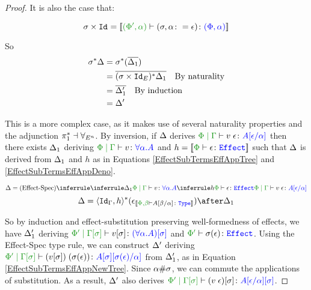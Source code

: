 \documentclass{Report}
\begin{document}
\begin{framed}
\begin{proof}
    It is also the case that:
    
    \begin{equation}
        \si\times\Id{} = \deno{\typerelation{(\P',\a)}{(\si, \a\setto\e)}{(\P,\a)}}
    \end{equation}
    
    So
    \begin{align*}
        \sigma^*\Delta &= \sigma^*(\overline{\Delta_1})\\
        & = \overline{(\sigma\times\texttt{Id}_{E})^*\Delta_1}\quad\text{By naturality}\\
        & = \overline{\Delta_1'}\quad\text{By induction}\\
        & = \Delta'
    \end{align*}
    
    \case{\vspec}
    
    This is a more complex case, as it makes use of several naturality properties and the adjunction $\pi_1^*\dashv\forall_{E^n}$. By inversion, if $\Delta$ derives $\gpetyperelation{\eapp{v}{\e}}{A\ssub{\a}{\e}}$ then there exists $\Delta_1$ deriving $\gpetyperelation{v}{\all{\a}{A}}$ and $h = \deno{\typerelation{\P}{\e}{\effect}}$ such that $\Delta$ is derived from $\Delta_1$ and $h$ as in Equations \ref{EffectSubTermsEffAppTree} and \ref{EffectSubTermsEffAppDeno}.
    
    
    \begin{equation}\label{EffectSubTermsEffAppTree}
        \D = \ntreeruleII{\vspec}{\treeruleI{\D_1}{\gpetyperelation{v}{\all{\a}{A}}}}{\treeruleI{h}{\typerelation{\P}{\e}{\effect}}}{\gpetyperelation{\eapp{v}{\e}}{A\ssub{\a}{\e}}}
    \end{equation}
    \begin{equation}\label{EffectSubTermsEffAppDeno}
        \D = \pr{\Id{\G}}{h}\star(\e_{\deno{\typerelation{\P,\b}{A\ssub{\a}{\b}}{\type}}})\after\D_1
    \end{equation}
    
    So by induction and effect-substitution preserving well-formedness of effects, we have $\Delta_1'$ deriving $\etyperelation{\P'}{\G\ssi}{v\ssi}{(\all{\a}{A})\ssi}$ and $\wellformedeffect{\P'}{\si(\e)}$. Using the Effect-Spec type rule, we can construct $\Delta'$ deriving $\etyperelation{\P'}{\G\ssi}{\eapp{(v\ssi)}{(\si(\e))}}{A\ssi\ssub{\a}{\si(\e)}}$ from $\Delta_1'$, as in Equation \ref{EffectSubTermsEffAppNewTree}. Since $\alpha\#\sigma$, we can commute the applications of substitution. As a result, $\Delta'$ also derives $\etyperelation{\P'}{\G\ssi}{(\eapp{v}{\e})\ssi}{A\ssub{\a}{\e}\ssi}$.
    

\end{proof}
\end{framed}
\end{document}
